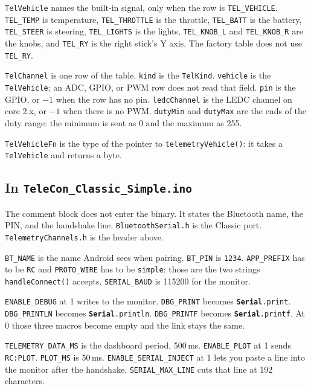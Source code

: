 \documentclass[11pt,a4paper]{article}
\newcommand{\nm}[1]{\textcolor{ArduinoName}{\texttt{#1}}}
\newcommand{\fnm}[1]{\textcolor{ArduinoFunc}{\texttt{#1}}}
\newcommand{\str}[1]{\textcolor{ArduinoString}{\texttt{#1}}}
\newcommand{\ser}[1]{\textcolor{ArduinoFunc}{\textbf{\texttt{Serial}}\texttt{.#1}}}
\newcommand{\sketchfile}{../../../ESP32_noCam/Classic_Simple/TeleCon_Classic_Simple/TeleCon_Classic_Simple.ino}
\newcommand{\channelfile}{../../../ESP32_noCam/Classic_Simple/TeleCon_Classic_Simple/TelemetryChannels.h}
\newcommand{\inosnippet}[2]{%
  \par\addvspace{1.35em}%
}
\newcommand{\hsnippet}[2]{%
  \par\addvspace{1.35em}%
}
\begin{document}
\nm{TelVehicle} names the built-in signal, only when the row is
\nm{TEL\_VEHICLE}. \nm{TEL\_TEMP} is temperature,
\nm{TEL\_THROTTLE} is the throttle, \nm{TEL\_BATT} is the battery,
\nm{TEL\_STEER} is steering, \nm{TEL\_LIGHTS} is the lights,
\nm{TEL\_KNOB\_L} and \nm{TEL\_KNOB\_R} are the knobs, and
\nm{TEL\_RY} is the right stick's Y axis. The factory table does
not use \nm{TEL\_RY}.

\hsnippet{35}{44}

\nm{TelChannel} is one row of the table. \nm{kind} is the
\nm{TelKind}. \nm{vehicle} is the \nm{TelVehicle}; an ADC, GPIO,
or PWM row does not read that field. \nm{pin} is the GPIO, or
$-1$ when the row has no pin. \nm{ledcChannel} is the LEDC channel
on core 2.x, or $-1$ when there is no PWM. \nm{dutyMin} and
\nm{dutyMax} are the ends of the duty range: the minimum is sent
as 0 and the maximum as 255.

\nm{TelVehicleFn} is the type of the pointer to
\fnm{telemetryVehicle()}: it takes a \nm{TelVehicle} and returns
a byte.

\subsection{In \texttt{TeleCon\_Classic\_Simple.ino}}

\inosnippet{1}{14}

The comment block does not enter the binary. It states the Bluetooth
name, the PIN, and the handshake line. \texttt{BluetoothSerial.h} is
the Classic port. \texttt{TelemetryChannels.h} is the header above.

\inosnippet{16}{45}

\nm{BT\_NAME} is the name Android sees when pairing.
\nm{BT\_PIN} is \str{1234}. \nm{APP\_PREFIX} has to be
\str{RC} and \nm{PROTO\_WIRE} has to be \str{simple}: those are
the two strings \fnm{handleConnect()} accepts.
\nm{SERIAL\_BAUD} is 115200 for the monitor.

\nm{ENABLE\_DEBUG} at 1 writes to the monitor.
\nm{DBG\_PRINT} becomes \ser{print}.
\nm{DBG\_PRINTLN} becomes \ser{println}.
\nm{DBG\_PRINTF} becomes \ser{printf}.
At 0 those three macros become empty and the link stays the same.

\nm{TELEMETRY\_DATA\_MS} is the dashboard period, 500\,ms.
\nm{ENABLE\_PLOT} at 1 sends \str{RC:PLOT}.
\nm{PLOT\_MS} is 50\,ms.
\nm{ENABLE\_SERIAL\_INJECT} at 1 lets you paste a line into the
monitor after the handshake.
\nm{SERIAL\_MAX\_LINE} cuts that line at 192 characters.
\end{document}
